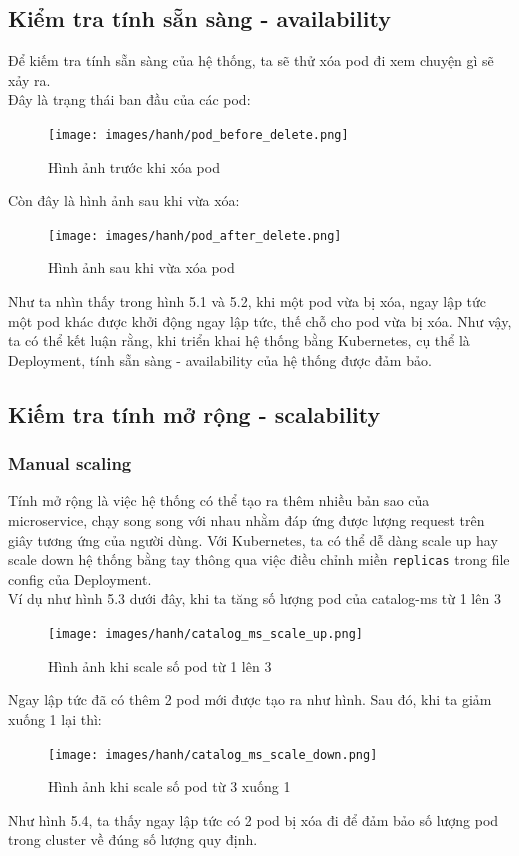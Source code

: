 \subsection{Kiểm tra tính sẵn sàng - availability}
\noindent Để kiếm tra tính sẵn sàng của hệ thống, ta sẽ thử xóa pod đi xem chuyện gì sẽ xảy ra.\\[0.5cm]
Đây là trạng thái ban đầu của các pod:
\begin{figure}[H]
  \begin{center}
  \texttt{[image: images/hanh/pod\_before\_delete.png]}
  \caption{Hình ảnh trước khi xóa pod}
  \end{center}
\end{figure}
Còn đây là hình ảnh sau khi vừa xóa:
\begin{figure}[H]
  \begin{center}
  \texttt{[image: images/hanh/pod\_after\_delete.png]}
  \caption{Hình ảnh sau khi vừa xóa pod}
  \end{center}
\end{figure}
Như ta nhìn thấy trong hình 5.1 và 5.2, khi một pod vừa bị xóa, ngay lập tức một pod khác được khởi động ngay lập tức, thế chỗ cho pod vừa bị xóa. Như vậy, ta có thể kết luận rằng, khi triển khai hệ thống bằng Kubernetes, cụ thể là Deployment, tính sẵn sàng - availability của hệ thống được đảm bảo.
\subsection{Kiếm tra tính mở rộng - scalability}
\subsubsection{Manual scaling}
\noindent Tính mở rộng là việc hệ thống có thể tạo ra thêm nhiều bản sao của microservice, chạy song song với nhau nhằm đáp ứng được lượng request trên giây tương ứng của người dùng. Với Kubernetes, ta có thể dễ dàng scale up hay scale down hệ thống bằng tay thông qua việc điều chỉnh miền \lstinline|replicas| trong file config của Deployment.\\[0.5cm]
Ví dụ như hình 5.3 dưới đây, khi ta tăng số lượng pod của catalog-ms từ 1 lên 3
\begin{figure}[H]
  \begin{center}
    \texttt{[image: images/hanh/catalog\_ms\_scale\_up.png]}
    \caption{Hình ảnh khi scale số pod từ 1 lên 3}
  \end{center}
\end{figure}
Ngay lập tức đã có thêm 2 pod mới được tạo ra như hình. Sau đó, khi ta giảm xuống 1 lại thì:
\begin{figure}[H]
  \begin{center}
    \texttt{[image: images/hanh/catalog\_ms\_scale\_down.png]}
    \caption{Hình ảnh khi scale số pod từ 3 xuống 1}
  \end{center}
\end{figure}
Như hình 5.4, ta thấy ngay lập tức có 2 pod bị xóa đi để đảm bảo số lượng pod trong cluster về đúng số lượng quy định.


